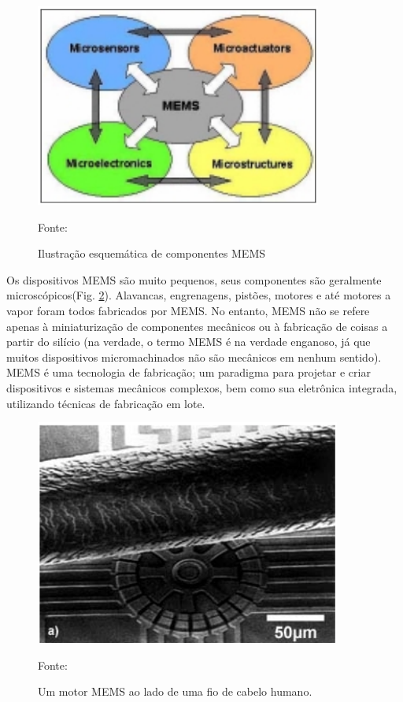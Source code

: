 		\begin{figure}[h]
			\centering
			\includegraphics[keepaspectratio=true,scale=0.5
			]{figuras/esquematico_mems.png}
			\caption{Ilustração esquemática de componentes MEMS}
			Fonte: \cite{prime2002}
			\label{esquematico_mems}
		\end{figure}

		Os dispositivos MEMS são muito pequenos, seus componentes são geralmente microscópicos(Fig. \ref{escala_mems}). Alavancas, engrenagens, pistões, motores e até motores a vapor foram todos fabricados por MEMS. No entanto, MEMS não se refere apenas à miniaturização de componentes mecânicos ou à fabricação de coisas a partir do silício (na verdade, o termo MEMS é na verdade enganoso, já que muitos dispositivos micromachinados não são mecânicos em nenhum sentido). MEMS é uma tecnologia de fabricação; um paradigma para projetar e criar dispositivos e sistemas mecânicos complexos, bem como sua eletrônica integrada, utilizando técnicas de fabricação em lote\cite{prime2002}.

		\begin{figure}[h]
			\centering
			\includegraphics[keepaspectratio=true,scale=0.5
			]{figuras/escala_mems.png}
			\caption{Um motor MEMS ao lado de uma fio de cabelo humano.}
			Fonte: \cite{prime2002}
			\label{escala_mems}
		\end{figure}

